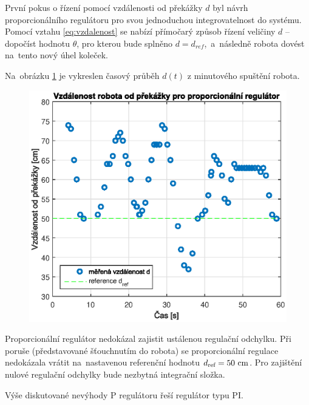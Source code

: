 \documentclass[conference]{IEEEtran}
\begin{document}
První pokus o řízení pomocí vzdálenosti od překážky $d$ byl návrh proporcionálního regulátoru pro svou jednoduchou integrovatelnost do systému.
 Pomocí vztahu \eqref{eq:vzdalenost} se nabízí přímočarý
způsob řízení veličiny $d$ -- dopočíst hodnotu $\theta$, pro kterou bude splněno $d = d_{ref}$,~a~následně robota dovést na~tento nový úhel koleček.



Na~obrázku \ref{fig:vzdalenost_P} je vykreslen časový průběh $d(t)$ z minutového spuštění robota.
\begin{figure}[htbp]
    \centerline{\includegraphics[width=\linewidth]{vzdalenost_od_prekazky_proporcionalni.eps}}
    \caption{}
    \label{fig:vzdalenost_P}        
\end{figure}
Proporcionální regulátor nedokázal zajistit ustálenou regulační odchylku. Při poruše (představované šťouchnutím do robota)
se proporcionální regulace nedokázala vrátit na~nastavenou referenční hodnotu $d_\text{ref} = 50~\text{\si{\centi\metre}}$.
Pro zajištění nulové regulační odchylky bude nezbytná integrační složka.


Výše diskutované nevýhody P regulátoru řeší regulátor typu PI.  
\end{document}
